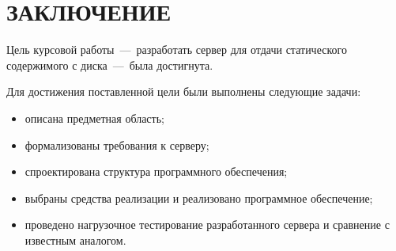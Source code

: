 \chapter*{ЗАКЛЮЧЕНИЕ}

Цель курсовой работы~---~разработать сервер для отдачи статического содержимого с диска~---~была достигнута.

Для достижения поставленной цели были выполнены следующие задачи:
\begin{itemize}
	\item описана предметная область;
	\item формализованы требования к серверу;
	\item спроектирована структура программного обеспечения;
	\item выбраны средства реализации и реализовано программное обеспечение;
	\item проведено нагрузочное тестирование разработанного сервера и сравнение с известным аналогом.
\end{itemize} 